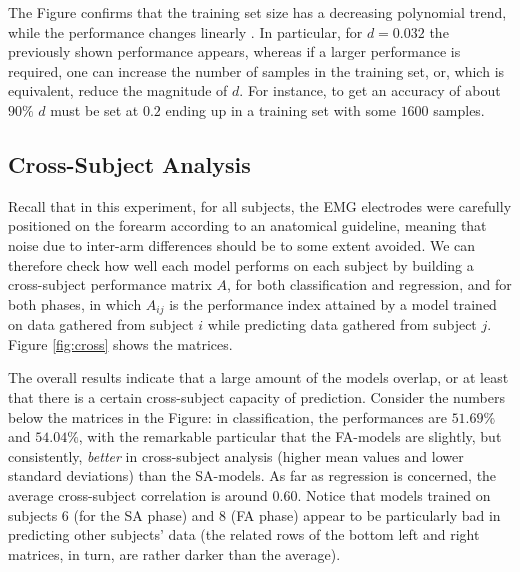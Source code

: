 \documentclass[10pt]{bmc_article}
\def\texttt{[image: ]}
\newenvironment{bmcformat}{\begin{raggedright}\baselineskip20pt\sloppy\setboolean{publ}{false}}{\end{raggedright}\baselineskip20pt\sloppy}
\begin{document}
\begin{bmcformat}
The Figure confirms that the training set size has a decreasing
polynomial trend, while the performance changes linearly
\cite{2008.BioCyb}. In
particular, for $d=0.032$ the previously shown performance appears,
whereas if a larger performance is required, one can increase the
number of samples in the training set, or, which is equivalent, reduce
the magnitude of $d$. For instance, to get an accuracy of about $90\%$
$d$ must be set at $0.2$ ending up in a training set with some $1600$
samples.

\subsection*{Cross-Subject Analysis}

Recall that in this experiment, for all subjects, the EMG electrodes
were carefully positioned on the forearm according to an anatomical
guideline, meaning that noise due to inter-arm differences should be
to some extent avoided. We can therefore check how well each model
performs on each subject by building a cross-subject performance
matrix $A$, for both classification and regression, and for both phases,
in which $A_{ij}$ is the performance index attained by a model trained
on data gathered from subject $i$ while predicting data gathered from
subject $j$.  Figure \ref{fig:cross} shows the matrices.


The overall results indicate that a large amount of the models
overlap, or at least that there is a certain cross-subject capacity of
prediction. Consider the numbers below the matrices in the Figure: in
classification, the performances are $51.69\%$ and $54.04\%$, with the
remarkable particular that the FA-models are slightly, but
consistently, \emph{better} in cross-subject analysis (higher mean
values and lower standard deviations) than the SA-models. As far as
regression is concerned, the average cross-subject correlation is
around $0.60$. Notice that models trained
on subjects $6$ (for the SA phase) and $8$ (FA phase) appear to be
particularly bad in predicting other subjects' data (the related rows
of the bottom left and right matrices, in turn, are rather darker than
the average).


\end{bmcformat}
\end{document}
